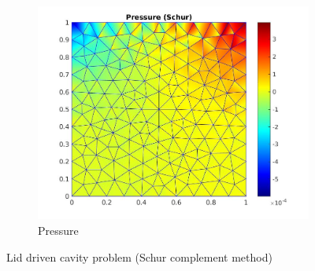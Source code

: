\documentclass{beamer}
\begin{document}
\begin{frame}
\begin{figure}
\begin{subfigure}{0.3\textwidth}
  \includegraphics[width=\linewidth]{lid_schur_pressure.jpg}
    \caption{Pressure} 
    \label{pressure_stoke_schur_lid}
\end{subfigure}
\caption{Lid driven cavity problem (Schur complement method)}
\label{stoke_schur_lid}
\end{figure}
\end{frame}
\end{document}

